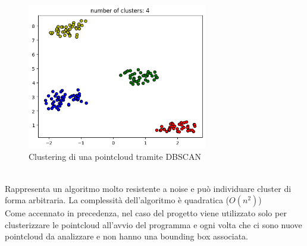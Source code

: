 \documentclass[italian]{article}
\begin{document}
\begin{figure}[H]
	\centering
	\includegraphics[width=0.7\textwidth]{dbscan}
	\footnotesize
	\caption{Clustering di una pointcloud tramite DBSCAN}	
\end{figure}\\
Rappresenta un algoritmo molto resistente a noise e può individuare cluster di forma arbitraria. La complessità dell'algoritmo è quadratica ($O(n^2)$)\\
Come accennato in precedenza, nel caso del progetto viene utilizzato solo per clusterizzare le pointcloud all'avvio del programma e ogni volta che ci sono nuove pointcloud da analizzare e non hanno una bounding box associata.
\end{document}
